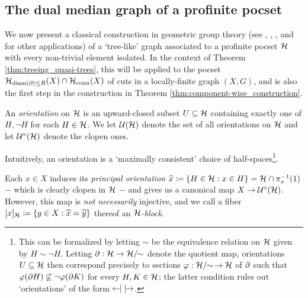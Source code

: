 \documentclass[reqno]{amsart}
\begin{document}
    \subsection{The dual median graph of a profinite pocset}\label{sec:the_dual_median_graph_of_a_pocset}

    We now present a classical construction in geometric group theory (see \cite{Dun79}, \cite{Rol98}, \cite{Sag95}, and \cite{NR03} for other applications) of a `tree-like' graph associated to a profinite pocset $\mathcal{H}$ with every non-trivial element isolated. In the context of Theorem \ref{thm:treeing_quasi-trees}, this will be applied to the pocset $\mathcal{H}_{\operatorname{diam}(\partial)\leq R}(X)\cap\mathcal{H}_\mathrm{conn}(X)$ of cuts in a locally-finite graph $(X,G)$, and is also the first step in the construction in Theorem \ref{thm:component-wise_construction}.
    
    \begin{definition}\label{def:orientation}
        An \textit{orientation} on $\mathcal{H}$ is an upward-closed subset $U\subseteq\mathcal{H}$ containing exactly one of $H,\lnot H$ for each $H\in\mathcal{H}$. We let $\mathcal{U}(\mathcal{H})$ denote the set of all orientations on $\mathcal{H}$ and let $\mathcal{U}^\circ(\mathcal{H})$ denote the clopen ones.

        Intuitively, an orientation is a `maximally consistent' choice of half-spaces\footnote{This can be formalized by letting $\sim$ be the equivalence relation on $\mathcal{H}$ given by $H\sim\lnot H$. Letting $\partial:\mathcal{H}\to\mathcal{H}/\!\!\sim$ denote the quotient map, orientations $U\subseteq\mathcal{H}$ then correspond precisely to sections $\varphi:\mathcal{H}/\!\!\sim\,\to\mathcal{H}$ of $\partial$ such that $\varphi(\partial H)\not\subseteq\lnot\varphi(\partial K)$ for every $H,K\in\mathcal{H}$; the latter condition rules out `orientations' of the form $\leftarrow\hspace{-4.15pt}|\,\,|\hspace{-4.15pt}\rightarrow$.}.
    \end{definition}

    \begin{example}
        Each $x\in X$ induces its \textit{principal orientation} $\widehat{x}\coloneqq\left\{H\in\mathcal{H}: x\in H\right\}=\mathcal{H}\cap\pi^{-1}_x(1)$ $-$ which is clearly clopen in $\mathcal{H}$ $-$ and gives us a canonical map $X\to\mathcal{U}^\circ(\mathcal{H})$. However, this map is \textit{not necessarily} injective, and we call a fiber $[x]_{\mathcal{H}}\coloneqq\left\{y\in X:\widehat{x}=\widehat{y}\right\}$ thereof an \textit{$\mathcal{H}$-block}.
    \end{example}
\end{document}

